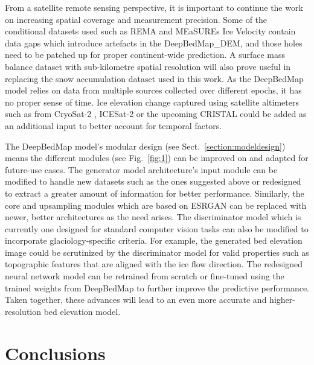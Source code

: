 From a satellite remote sensing perspective, it is important to continue the work on increasing spatial coverage and measurement precision.
Some of the conditional datasets used such as REMA \citep{HowatReferenceElevationModel2019} and MEaSUREs Ice Velocity \citep{MouginotMEaSUREsPhaseMap2019} contain data gaps which introduce artefacts in the DeepBedMap\_DEM, and those holes need to be patched up for proper continent-wide prediction.
A surface mass balance dataset with sub-kilometre spatial resolution will also prove useful in replacing the snow accumulation dataset \citep{ArthernAntarcticsnowaccumulation2006} used in this work.
As the DeepBedMap model relies on data from multiple sources collected over different epochs, it has no proper sense of time.
Ice elevation change captured using satellite altimeters such as from CryoSat-2 \citep{HelmElevationelevationchange2014}, ICESat-2 \citep{MarkusIceCloudland2017} or the upcoming CRISTAL \citep{KernCopernicusPolarIce2020} could be added as an additional input to better account for temporal factors.

The DeepBedMap model's modular design (see Sect.~\ref{section:modeldesign}) means the different modules (see Fig.~\ref{fig:1}) can be improved on and adapted for future-use cases.
The generator model architecture's input module can be modified to handle new datasets such as the ones suggested above or redesigned to extract a greater amount of information for better performance.
Similarly, the core and upsampling modules which are based on ESRGAN \citep{WangESRGANEnhancedSuperResolution2019} can be replaced with newer, better architectures as the need arises.
The discriminator model which is currently one designed for standard computer vision tasks can also be modified to incorporate glaciology-specific criteria.
For example, the generated bed elevation image could be scrutinized by the discriminator model for valid properties such as topographic features that are aligned with the ice flow direction.
The redesigned neural network model can be retrained from scratch or fine-tuned using the trained weights from DeepBedMap to further improve the predictive performance.
Taken together, these advances will lead to an even more accurate and higher-resolution bed elevation model.


\section{Conclusions}  %

